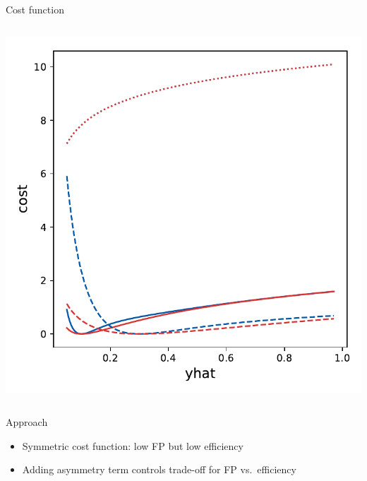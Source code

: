 \begin{frame}{Cost function}
\begin{columns}
      \centering
      \includegraphics[width=\textwidth, trim=20 0 20 0]{images/Asym_CostPlot_190302_linearA.pdf}
      \end{columns}


    \begin{block}{Approach}
      \begin{itemize}
         \item Symmetric cost function: low FP but low efficiency
         \item Adding asymmetry term controls trade-off for FP vs.\ efficiency
     \end{itemize}
    \end{block}
\end{frame}
